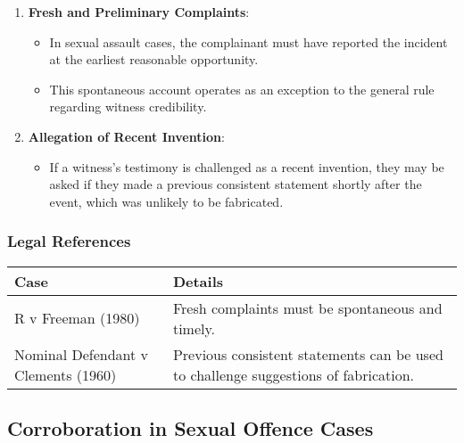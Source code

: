 \begin{enumerate}
\def\labelenumi{\arabic{enumi}.}
\tightlist
\item
  \textbf{Fresh and Preliminary Complaints}:

  \begin{itemize}
  \tightlist
  \item
    In sexual assault cases, the complainant must have reported the
    incident at the earliest reasonable opportunity.
  \item
    This spontaneous account operates as an exception to the general
    rule regarding witness credibility.
  \end{itemize}
\item
  \textbf{Allegation of Recent Invention}:

  \begin{itemize}
  \tightlist
  \item
    If a witness's testimony is challenged as a recent invention, they
    may be asked if they made a previous consistent statement shortly
    after the event, which was unlikely to be fabricated.
  \end{itemize}
\end{enumerate}

\subsubsection{Legal References}\label{legal-references-1}

\begin{longtable}[]{@{}
  >{\raggedright\arraybackslash}p{}
  >{\raggedright\arraybackslash}p{}@{}}
\toprule\noalign{}
\begin{minipage}[b]{\linewidth}\raggedright
\textbf{Case}
\end{minipage} & \begin{minipage}[b]{\linewidth}\raggedright
\textbf{Details}
\end{minipage} \\
\midrule\noalign{}
\endhead
\bottomrule\noalign{}
\endlastfoot
R v Freeman (1980) & Fresh complaints must be spontaneous and timely. \\
Nominal Defendant v Clements (1960) & Previous consistent statements can
be used to challenge suggestions of fabrication. \\
\end{longtable}

\subsection{ Corroboration in Sexual Offence
Cases}\label{corroboration-in-sexual-offence-cases}

